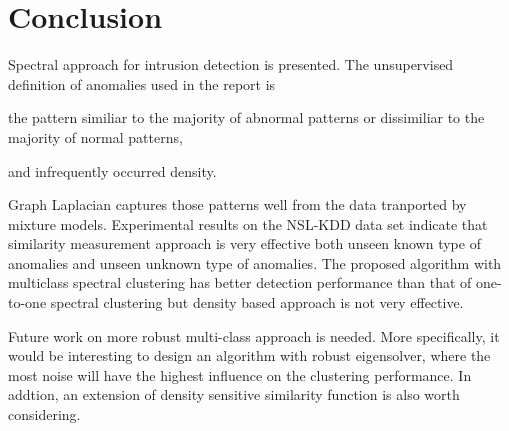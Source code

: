 \section{Conclusion}
Spectral approach for intrusion detection is presented. 
The unsupervised definition of anomalies used in the report is 
\begin{inparaenum}
\item the pattern similiar to the majority of abnormal patterns or dissimiliar to the majority of normal patterns, 
\item and infrequently occurred density.
\end{inparaenum}
Graph Laplacian captures those patterns well from the data tranported by mixture models. 
Experimental results on the NSL-KDD data set indicate that similarity measurement approach is very effective both unseen known type of anomalies and unseen unknown type of anomalies. 
The proposed algorithm with multiclass spectral clustering has better detection performance than that of one-to-one spectral clustering but density based approach is not very effective. 

Future work on more robust multi-class approach is needed. 
More specifically, it would be interesting to design an algorithm with robust eigensolver, where the most noise will have the highest influence on the clustering performance. 
In addtion, an extension of density sensitive similarity function is also worth considering. 
